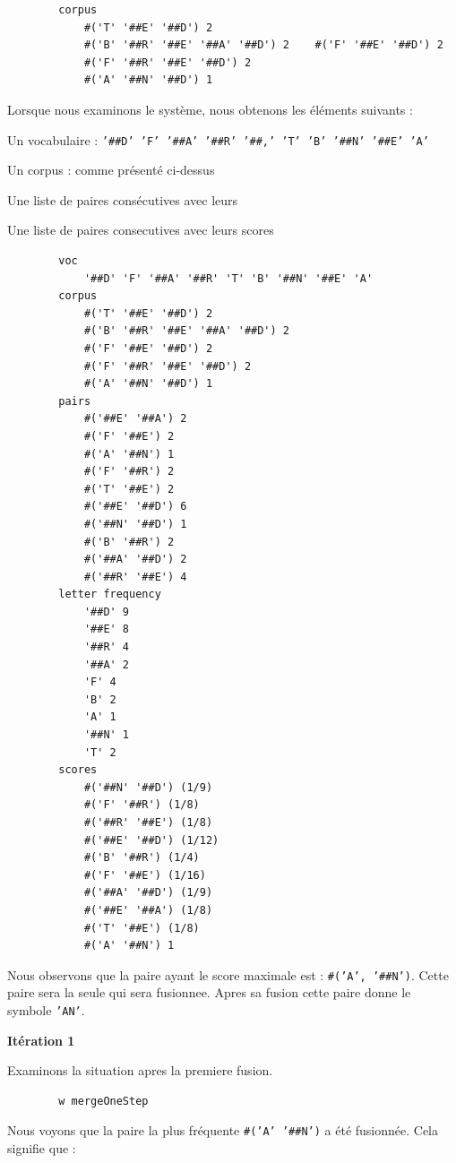 \documentclass[12pt,a4paper]{report}
\begin{document}
	\begin{verbatim}
		corpus   	
			#('T' '##E' '##D') 2 	
			#('B' '##R' '##E' '##A' '##D') 2 	#('F' '##E' '##D') 2 	
			#('F' '##R' '##E' '##D') 2 
			#('A' '##N' '##D') 1 
	\end{verbatim}
	
	Lorsque nous examinons le système, nous obtenons les éléments suivants :
	
	\begin{itemizeFB}
		\item Un vocabulaire : \texttt{'\#\#D' 'F' '\#\#A' '\#\#R' '\#\#,' 'T' 'B' '\#\#N' '\#\#E' 'A'}
		\item Un corpus : comme présenté ci-dessus
		\item Une liste de paires consécutives avec leurs
		\item Une liste de paires consecutives avec leurs scores
	\end{itemizeFB}
	
	\begin{verbatim}
		voc  
			'##D' 'F' '##A' '##R' 'T' 'B' '##N' '##E' 'A'
		corpus    	
			#('T' '##E' '##D') 2 	
			#('B' '##R' '##E' '##A' '##D') 2
			#('F' '##E' '##D') 2 	
			#('F' '##R' '##E' '##D') 2 	
			#('A' '##N' '##D') 1
		pairs   	
			#('##E' '##A') 2 	
			#('F' '##E') 2 	
			#('A' '##N') 1 	
			#('F' '##R') 2 	
			#('T' '##E') 2 	
			#('##E' '##D') 6 	
			#('##N' '##D') 1 	
			#('B' '##R') 2 	
			#('##A' '##D') 2 	
			#('##R' '##E') 4
		letter frequency  	
			'##D' 9 	
			'##E' 8 	
			'##R' 4 	
			'##A' 2 	
			'F' 4 	
			'B' 2 	 	
			'A' 1 	
			'##N' 1 	
			'T' 2
		scores  	
			#('##N' '##D') (1/9) 	
			#('F' '##R') (1/8) 	
			#('##R' '##E') (1/8) 	
			#('##E' '##D') (1/12) 	
			#('B' '##R') (1/4) 	
			#('F' '##E') (1/16) 	
			#('##A' '##D') (1/9) 	
			#('##E' '##A') (1/8) 	
			#('T' '##E') (1/8) 	
			#('A' '##N') 1
	\end{verbatim}
	
	
	Nous observons que la paire ayant le score maximale est : \texttt{\#('A', '\#\#N')}. Cette paire sera la seule qui sera fusionnee.
	Apres sa fusion cette paire donne le symbole \texttt{'AN'}.
	
	\textbf{Itération 1}
	
	Examinons la situation apres la premiere fusion.
	
	\begin{verbatim}
		w mergeOneStep
	\end{verbatim}
	
	Nous voyons que la paire la plus fréquente \texttt{\#('A' '\#\#N')} a été fusionnée. Cela signifie que :
	
\end{document}
